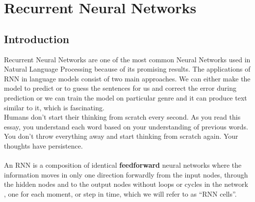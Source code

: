 \section{Recurrent Neural Networks}
\label{chap:Recurrent Neural Networks}

\subsection{Introduction}
 Recurrent Neural Networks are one of the most common Neural Networks used in Natural Language Processing because of its promising results. The applications of RNN in language models consist of two main approaches. We can either make the model to predict or to guess the sentences for us and correct the error during prediction or we can train the model on particular genre and it can produce text similar to it, which is fascinating.\\
\indent Humans don’t start their thinking from scratch every second. As you read this essay, you understand each word based on your understanding of previous words. You don’t throw everything away and start thinking from scratch again. Your thoughts have persistence.\\\\
\indent An RNN is a composition of identical \textbf{feedforward} neural networks where the information moves in only one direction forwardly from the input
nodes, through the hidden nodes and to the output nodes without loops or cycles in the
network
, one for each moment, or step in time, which we will refer to as “RNN cells”.
